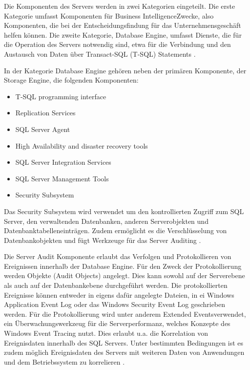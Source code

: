 Die Komponenten des Servers werden in zwei Kategorien eingeteilt. Die erste Kategorie umfasst Komponenten für \glqq Business Intelligence\grqq  Zwecke, also Komponenten, die bei der Entscheidungsfindung für das Unternehmensgeschäft helfen können. Die zweite Kategorie, \glqq Database Engine\grqq , umfasst Dienste, die für die Operation des Servers notwendig sind, etwa für die Verbindung und den Austausch von Daten über Transact-SQL (T-SQL) Statements \citep{MSSQL2}.

In der Kategorie Database Engine gehören neben der primären Komponente, der Storage Engine, die folgenden Komponenten:
\begin{itemize}
\item T-SQL programming interface
\item Replication Services
\item SQL Server Agent
\item High Availability and disaster recovery tools
\item SQL Server Integration Services
\item SQL Server Management Tools
\item Security Subsystem
\end{itemize}
\citep{MSSQL3}

Das Security Subsystem wird verwendet um den kontrollierten Zugriff zum SQL Server, den verwaltenden Datenbanken, anderen Serverobjekten und Datenbanktabelleneinträgen. Zudem ermöglicht es die Verschlüsselung von Datenbankobjekten und fügt Werkzeuge für das Server Auditing \citep{MSSQL4}.

Die Server Audit Komponente erlaubt das Verfolgen und Protokollieren von Ereignissen innerhalb der Database Engine. Für den Zweck der Protokollierung werden Objekte (Audit Objects) angelegt. Dies kann sowohl auf der Serverebene als auch auf der Datenbankebene durchgeführt werden. Die protokollierten Ereignisse können entweder in eigens dafür angelegte Dateien, in ei Windows Application Event Log oder das Windows Security Event Log geschrieben werden. Für die Protokollierung wird unter anderem \glqq Extended Events\grqq verwendet, ein Überwachungswerkzeug für die Serverperformanz, welches Konzepte des Windows Event Tracing nutzt. Dies erlaubt u.a. die Korrelation von Ereignisdaten innerhalb des SQL Servers. Unter bestimmten Bedingungen ist es zudem möglich Ereignisdaten des Servers mit weiteren Daten von Anwendungen und dem Betriebssystem zu korrelieren \citep{MSSQL5}. 

